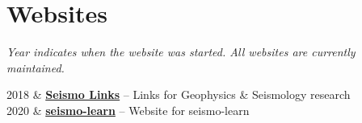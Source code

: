 \section{Websites}

\textit{Year indicates when the website was started. All websites are currently maintained.}

\begin{EntriesTable}{0.05}{0.02}{0.93}
2018 &	\textbf{\href{https://seismo-learn.org/links/}{Seismo Links}} -- Links for Geophysics \& Seismology research \\
2020 &	\textbf{\href{https://seismo-learn.org/}{seismo-learn}} -- Website for seismo-learn \\
\end{EntriesTable}
